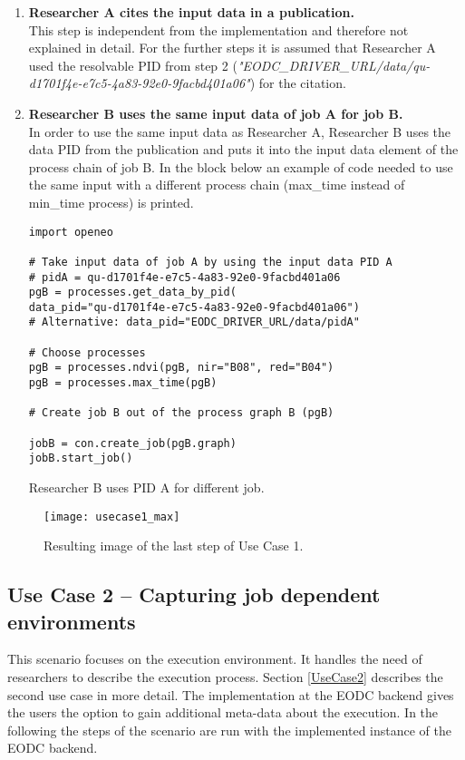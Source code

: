 \documentclass[draft,final]{vutinfth} %
\newenvironment{code}{\captionsetup{type=listing}}{}
\begin{document}
\begin{enumerate}
	\item \textbf{Researcher A cites the input data in a publication.} \\
	This step is independent from the implementation and therefore not explained in detail. For the further steps it is assumed that Researcher A used the resolvable PID from step 2 (\textit{"EODC\_DRIVER\_URL/data/qu-d1701f4e-e7c5-4a83-92e0-9facbd401a06"}) for the citation.   
	
	\item \textbf{Researcher B uses the same input data of job A for job B.} \\
	In order to use the same input data as Researcher A, Researcher B uses the data PID from the publication and puts it into the input data element of the process chain of job B. In the block below an example of code needed to use the same input with a different process chain (max\_time instead of min\_time process) is printed.   

\begin{code}
	\begin{verbatim}
import openeo

# Take input data of job A by using the input data PID A
# pidA = qu-d1701f4e-e7c5-4a83-92e0-9facbd401a06
pgB = processes.get_data_by_pid(
data_pid="qu-d1701f4e-e7c5-4a83-92e0-9facbd401a06")
# Alternative: data_pid="EODC_DRIVER_URL/data/pidA" 

# Choose processes
pgB = processes.ndvi(pgB, nir="B08", red="B04")
pgB = processes.max_time(pgB)

# Create job B out of the process graph B (pgB)

jobB = con.create_job(pgB.graph)
jobB.start_job()
	\end{verbatim}
	\caption{Researcher B uses PID A for different job.}
	\label{lst:impl_usecase1_3}
\end{code}
	
\end{enumerate}

\begin{figure}[h]
	\centering
	\texttt{[image: usecase1\_max]}
	\caption{Resulting image of the last step of Use Case 1.}
	\label{fig:impl_usecase1_max} %
\end{figure}

\subsection{Use Case 2 – Capturing job dependent environments}\label{Implementation:Use Case2}
This scenario focuses on the execution environment. It handles the need of researchers to describe the execution process. Section \ref{UseCase2} describes the second use case in more detail. The implementation at the EODC backend gives the users the option to gain additional meta-data about the execution. In the following the steps of the scenario are run with the implemented instance of the EODC backend.    
\end{document}
